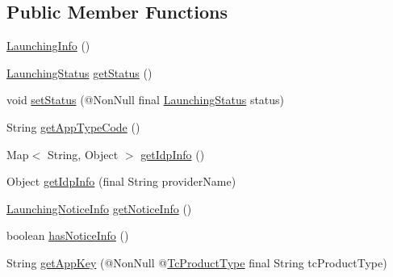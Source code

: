 \subsection*{Public Member Functions}
\begin{DoxyCompactItemize}
\item 
\hyperlink{classcom_1_1toast_1_1android_1_1gamebase_1_1launching_1_1data_1_1_launching_info_a54a98e9d898e08dc8146e51c629aafc5}{Launching\+Info} ()
\item 
\hyperlink{classcom_1_1toast_1_1android_1_1gamebase_1_1launching_1_1data_1_1_launching_status}{Launching\+Status} \hyperlink{classcom_1_1toast_1_1android_1_1gamebase_1_1launching_1_1data_1_1_launching_info_a8582cbd46fc749961b7d6fdf9806d2e3}{get\+Status} ()
\item 
void \hyperlink{classcom_1_1toast_1_1android_1_1gamebase_1_1launching_1_1data_1_1_launching_info_ace8e2c637942b7ef713c7de556c7d21e}{set\+Status} (@Non\+Null final \hyperlink{classcom_1_1toast_1_1android_1_1gamebase_1_1launching_1_1data_1_1_launching_status}{Launching\+Status} status)
\item 
String \hyperlink{classcom_1_1toast_1_1android_1_1gamebase_1_1launching_1_1data_1_1_launching_info_a609cdcf4ac851eee4c8fb106551b9f26}{get\+App\+Type\+Code} ()
\item 
Map$<$ String, Object $>$ \hyperlink{classcom_1_1toast_1_1android_1_1gamebase_1_1launching_1_1data_1_1_launching_info_a9cb037d1d2fa827d078184ea261040d5}{get\+Idp\+Info} ()
\item 
Object \hyperlink{classcom_1_1toast_1_1android_1_1gamebase_1_1launching_1_1data_1_1_launching_info_ad5c4686805f40096b32162a3665e7652}{get\+Idp\+Info} (final String provider\+Name)
\item 
\hyperlink{classcom_1_1toast_1_1android_1_1gamebase_1_1launching_1_1data_1_1_launching_notice_info}{Launching\+Notice\+Info} \hyperlink{classcom_1_1toast_1_1android_1_1gamebase_1_1launching_1_1data_1_1_launching_info_affb8d9ad34899ed21feb199d852fe3aa}{get\+Notice\+Info} ()
\item 
boolean \hyperlink{classcom_1_1toast_1_1android_1_1gamebase_1_1launching_1_1data_1_1_launching_info_ac91ad762db5dcaf305204a290389a477}{has\+Notice\+Info} ()
\item 
String \hyperlink{classcom_1_1toast_1_1android_1_1gamebase_1_1launching_1_1data_1_1_launching_info_a4f0fb2ae4b32c93413fa75c8f0977eb1}{get\+App\+Key} (@Non\+Null @\hyperlink{interfacecom_1_1toast_1_1android_1_1gamebase_1_1launching_1_1data_1_1_launching_info_1_1_tc_product_type}{Tc\+Product\+Type} final String tc\+Product\+Type)

\end{DoxyCompactItemize}
